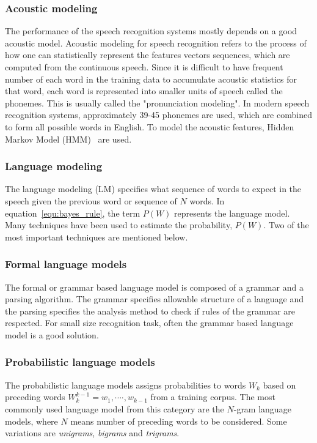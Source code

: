 \documentclass[a4paper, 12pt]{article}
\begin{document}
\subsubsection{Acoustic modeling}
The performance of the speech recognition systems mostly depends on a good acoustic model. Acoustic modeling for speech recognition refers to the process of how one can statistically represent the features vectors sequences, which are computed from the continuous speech. Since it is difficult to have frequent number of each word in the training data to accumulate acoustic statistics for that word, each word is represented into smaller units of speech called the phonemes. This is usually called the  "pronunciation modeling". In modern speech recognition systems, approximately 39-45 phonemes are used, which are combined to form all possible words in English. To model the acoustic features, Hidden Markov Model (HMM)~\cite{hmm_for_SR} are used.

\subsubsection{Language modeling}
The language modeling (LM) specifies what sequence of words to expect in the speech given the previous word or sequence of $N$ words. In equation~\ref{equ:bayes_rule}, the term $P(W)$ represents the language model. Many techniques have been used to estimate the probability, $P(W)$. Two of the most important techniques are mentioned below.
\subsubsection*{Formal language models} 
\label{sec:gramar_based_lm}
The formal or grammar based language model is composed of a grammar and a parsing algorithm. The grammar specifies allowable structure of a language and the parsing specifies the analysis method to check if rules of the grammar are respected. For small size recognition task, often the grammar based language model is a good solution. 
\subsubsection*{Probabilistic language models}
\label{sec:prob_lang_model}
The probabilistic language models assigns probabilities to words $\textit{W}_k$ based on preceding words $\textit{W}_k^{k-1} = \textit{w}_1 , \cdots \cdot,\textit{w}_{k-1}$  from a training corpus. The most commonly used language model from this category are the $N$-gram language models, where $N$ means number of preceding words to be considered. Some variations are \textit{unigrams}, \textit{bigrams} and \textit{trigrams}. 
\end{document}

